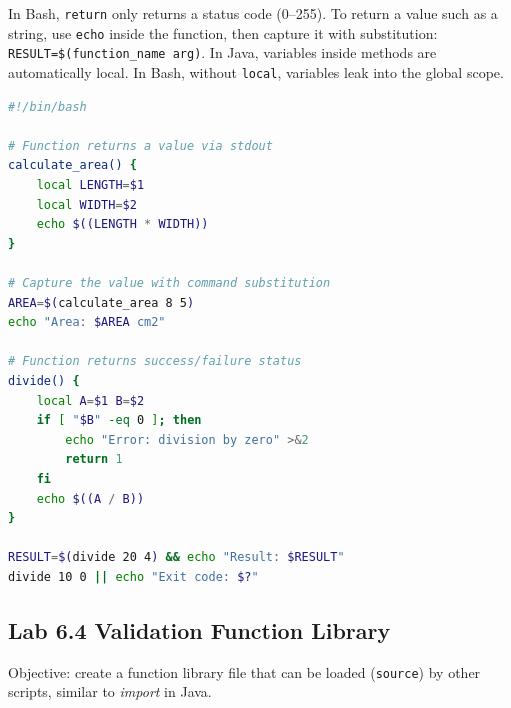 \begin{notebox}
In Bash, \texttt{return} only returns a status code (0--255). To return a
value such as a string, use \texttt{echo} inside the function, then capture
it with substitution: \texttt{RESULT=\$(function\_name arg)}. In Java,
variables inside methods are automatically local. In Bash, without
\texttt{local}, variables leak into the global scope.
\end{notebox}

\begin{lstlisting}[language=bash, caption={Defining and calling functions}]
#!/bin/bash

# Function returns a value via stdout
calculate_area() {
    local LENGTH=$1
    local WIDTH=$2
    echo $((LENGTH * WIDTH))
}

# Capture the value with command substitution
AREA=$(calculate_area 8 5)
echo "Area: $AREA cm2"

# Function returns success/failure status
divide() {
    local A=$1 B=$2
    if [ "$B" -eq 0 ]; then
        echo "Error: division by zero" >&2
        return 1
    fi
    echo $((A / B))
}

RESULT=$(divide 20 4) && echo "Result: $RESULT"
divide 10 0 || echo "Exit code: $?"
\end{lstlisting}

\subsection*{Lab 6.4 Validation Function Library}

Objective: create a function library file that can be loaded
(\texttt{source}) by other scripts, similar to \textit{import} in Java.

